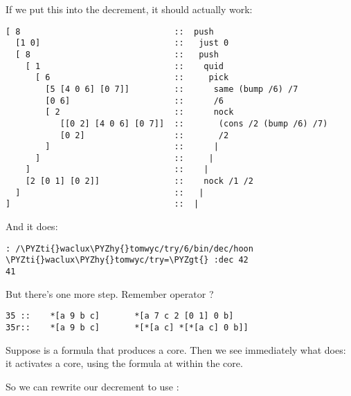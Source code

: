 If we put this into the decrement, it should actually work:

\begin{framed_shaded}
\begin{Verbatim}[fontsize=\relsize{-2.5},fontseries=b,commandchars=\\\{\}]
[ 8                               ::  push
  [1 0]                           ::   just 0
  [ 8                             ::   push
    [ 1                           ::    quid
      [ 6                         ::     pick
        [5 [4 0 6] [0 7]]         ::      same (bump /6) /7
        [0 6]                     ::      /6
        [ 2                       ::      nock
           [[0 2] [4 0 6] [0 7]]  ::       (cons /2 (bump /6) /7)
           [0 2]                  ::       /2
        ]                         ::      |
      ]                           ::     |
    ]                             ::    |
    [2 [0 1] [0 2]]               ::    nock /1 /2
  ]                               ::   |
]                                 ::  |
\end{Verbatim}
\end{framed_shaded}

And it does:

\begin{framed_shaded}
\begin{Verbatim}[fontsize=\relsize{-2.5},fontseries=b,commandchars=\\\{\}]
: /\PYZti{}waclux\PYZhy{}tomwyc/try/6/bin/dec/hoon
\PYZti{}waclux\PYZhy{}tomwyc/try=\PYZgt{} :dec 42
41
\end{Verbatim}
\end{framed_shaded}

But there's one more step.  Remember operator ?

\begin{framed_shaded}
\begin{Verbatim}[fontsize=\relsize{-2.5},fontseries=b,commandchars=\\\{\}]
35 ::    *[a 9 b c]       *[a 7 c 2 [0 1] 0 b]
35r::    *[a 9 b c]       *[*[a c] *[*[a c] 0 b]]
\end{Verbatim}
\end{framed_shaded}

Suppose  is a formula that produces a core.  Then we see
immediately what  does: it activates a core, using the formula
at  within the core.

So we can rewrite our decrement to use :

